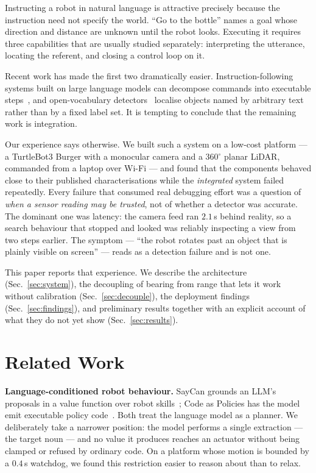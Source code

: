 \documentclass[conference]{IEEEtran}
\begin{document}
Instructing a robot in natural language is attractive precisely because the
instruction need not specify the world. ``Go to the bottle'' names a goal whose
direction and distance are unknown until the robot looks. Executing it requires
three capabilities that are usually studied separately: interpreting the
utterance, locating the referent, and closing a control loop on it.

Recent work has made the first two dramatically easier. Instruction-following
systems built on large language models can decompose commands into executable
steps~\cite{saycan,codeaspolicies}, and open-vocabulary
detectors~\cite{yoloworld,owlvit,groundingdino} localise objects named by
arbitrary text rather than by a fixed label set. It is tempting to conclude
that the remaining work is integration.

Our experience says otherwise. We built such a system on a low-cost platform
--- a TurtleBot3 Burger with a monocular camera and a 360$^\circ$ planar LiDAR,
commanded from a laptop over Wi-Fi --- and found that the components behaved
close to their published characterisations while the \emph{integrated} system
failed repeatedly. Every failure that consumed real debugging effort was a
question of \emph{when a sensor reading may be trusted}, not of whether a
detector was accurate. The dominant one was latency: the camera feed ran
$2.1$\,s behind reality, so a search behaviour that stopped and looked was
reliably inspecting a view from two steps earlier. The symptom --- ``the robot
rotates past an object that is plainly visible on screen'' --- reads as a
detection failure and is not one.

This paper reports that experience. We describe the architecture
(Sec.~\ref{sec:system}), the decoupling of bearing from range that lets it work
without calibration (Sec.~\ref{sec:decouple}), the deployment findings
(Sec.~\ref{sec:findings}), and preliminary results together with an explicit
account of what they do not yet show (Sec.~\ref{sec:results}).

\section{Related Work}

\textbf{Language-conditioned robot behaviour.} SayCan grounds an LLM's
proposals in a value function over robot skills~\cite{saycan}; Code as Policies
has the model emit executable policy code~\cite{codeaspolicies}. Both treat the
language model as a planner. We deliberately take a narrower position: the
model performs a single extraction --- the target noun --- and no value it
produces reaches an actuator without being clamped or refused by ordinary code.
On a platform whose motion is bounded by a $0.4$\,s watchdog, we found this
restriction easier to reason about than to relax.
\end{document}
